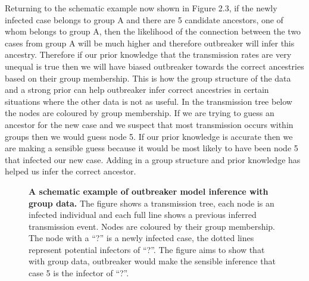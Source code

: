 \documentclass[11pt,a4paper]{report}
\begin{document}
Returning to the schematic example now shown in Figure 2.3, if the newly infected case belongs to group A and there are 5 candidate ancestors, one of whom belongs to group A, then the likelihood of the connection between the two cases from group A will be much higher and therefore outbreaker will infer this ancestry. Therefore if our prior knowledge that the transmission rates are very unequal is true then we will have biased outbreaker towards the correct ancestries based on their group membership. This is how the group structure of the data and a strong prior can help outbreaker infer correct ancestries in certain situations where the other data is not as useful. In the transmission tree below the nodes are coloured by group membership. If we are trying to guess an ancestor for the new case and we suspect that most transmission occurs within groups then we would guess node 5. If our prior knowledge is accurate then we are making a sensible guess because it would be most likely to have been node 5 that infected our new case. Adding in a group structure and prior knowledge has helped us infer the correct ancestor.
\begin{figure}[h!]
\centering
{}\newline

\caption{{\bf A schematic example of outbreaker model inference with group data.} The figure shows a transmission tree, each node is an infected individual and each full line shows a previous inferred transmission event. Nodes are coloured by their group membership. The node with a ``?'' is a newly infected case, the dotted lines represent potential infectors of ``?''. The figure aims to show that with group data, outbreaker would make the sensible inference that case 5 is the infector of ``?''.}
\end{figure}
\end{document}
